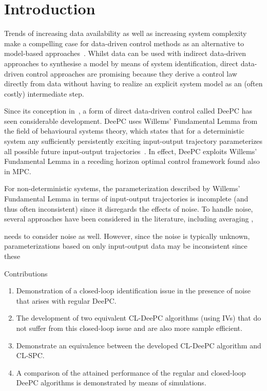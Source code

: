 \section{Introduction}
Trends of increasing data availability as well as increasing system complexity make a compelling case for data-driven control methods as an alternative to model-based approaches~\cite{Hou2013}. Whilst data can be used with indirect data-driven approaches to synthesise a model by means of system identification, direct data-driven control approaches are promising because they derive a control law directly from data without having to realize an explicit system model as an (often costly) intermediate step.

Since its conception in~\cite{Coulson2019}, a form of direct data-driven control called \ac{DeePC} has seen considerable development. \ac{DeePC} uses Willems' Fundamental Lemma from the field of behavioural systems theory, which states that for a deterministic system any sufficiently persistently exciting input-output trajectory parameterizes all possible future input-output trajectories~\cite{Willems2005}. In effect, \ac{DeePC} exploits Willems' Fundamental Lemma in a receding horizon optimal control framework found also in \ac{MPC}.

For non-deterministic systems, the parameterization described by Willems' Fundamental Lemma in terms of input-output trajectories is incomplete (and thus often inconsistent) since it disregards the effects of noise. To handle noise, several approaches have been considered in the literature, including averaging , 

needs to consider noise as well. However, since the noise is typically unknown, parameterizations based on only input-output data may be inconsistent since these


Contributions
\begin{enumerate}
\item Demonstration of a closed-loop identification issue in the presence of noise that arises with regular \ac{DeePC}.
\item The development of two equivalent \ac{CL-DeePC} algorithms (using \ac{IVs}) that do not suffer from this closed-loop issue and are also more sample efficient.
\item Demonstrate an equivalence between the developed \ac{CL-DeePC} algorithm and \ac{CL-SPC}.
\item A comparison of the attained performance of the regular and closed-loop \ac{DeePC} algorithms is demonstrated by means of simulations.
\end{enumerate}